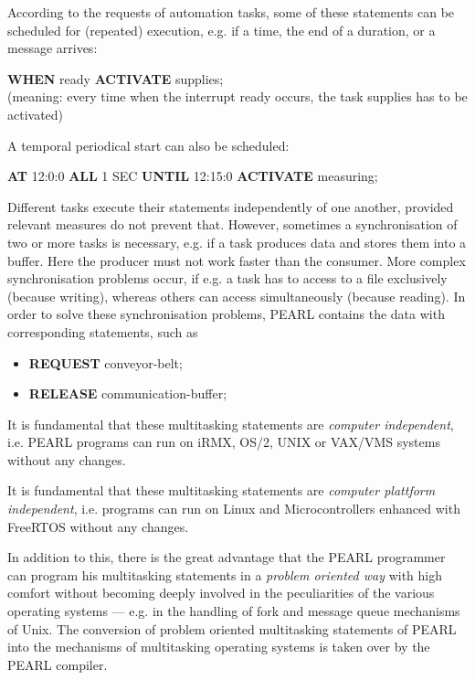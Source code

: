 According to the requests of automation tasks, some of these
statements can be scheduled for (repeated) execution, e.g. if a time,
the end of a duration, or a message arrives:

{\bf WHEN} ready {\bf ACTIVATE} supplies;\\
(meaning: every time when the interrupt ready occurs, the task supplies
has to be activated)

A temporal periodical start can also be scheduled:

{\bf AT} 12:0:0 {\bf ALL} 1 SEC {\bf UNTIL} 12:15:0 {\bf ACTIVATE} measuring;

Different tasks execute their statements independently of one another,
provided relevant measures do not prevent that. However, sometimes a
synchronisation of two or more tasks is necessary, e.g. if a task
produces data and stores them into a buffer. Here the producer must not
work faster than the consumer. More complex synchronisation problems
occur, if e.g. a task has to access to a file exclusively (because
writing), whereas others can access simultaneously (because reading). In
order to solve these synchronisation problems, PEARL contains the data
  
with corresponding statements, such as

\begin{itemize}
\item {\bf REQUEST} conveyor-belt;
\item {\bf RELEASE} communication-buffer;
\end{itemize}

\begin{removed}
It is fundamental that these multitasking statements are {\it computer
independent}, i.e. PEARL programs can run on iRMX, OS/2, UNIX or VAX/VMS
systems without any changes.
\end{removed}

\begin{added}
It is fundamental that these multitasking statements are {\it computer 
plattform independent}, i.e. \OpenPEARL{} programs can run on Linux and 
Microcontrollers enhanced with FreeRTOS without any changes.
\end{added}

In addition to this, there is the great advantage that the PEARL
programmer can program his multitasking statements in a {\it problem
oriented way} with high comfort without becoming deeply involved in the
peculiarities of the various operating systems --- e.g. in the handling
of fork and message queue mechanisms of Unix. The conversion of problem
oriented multitasking statements of PEARL into the mechanisms of
multitasking operating systems is taken over by the PEARL compiler.

